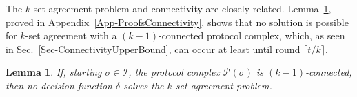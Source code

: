 \documentclass[11pt]{article}
\newcommand{\cI}{\ensuremath{\mathcal{I}}}
\newcommand{\cO}{\ensuremath{\mathcal{O}}}
\newcommand{\cP}{\ensuremath{\mathcal{P}}}
\newcommand{\bbG}{\ensuremath{\mathbb{G}}}
\newcommand{\bbP}{\ensuremath{\mathbb{P}}}
\DeclareMathOperator{\views}{views}
\newtheorem{definition}[theorem]{Definition}
\newtheorem{lemma}[theorem]{Lemma}
\newcommand{\set}[1]{\{#1\}}
\begin{document}
\begin{comment}
The $k$-set agreement problem~\cite{ksetagreement},
is a fundamental task having important associations
with protocol complex connectivity.
In Byzantine systems,
it can be difficult to characterize the input of a faulty process,
since this process can ignore its ``prescribed'' input and behave as having a different one.
This intrinsically leads to many alternative formulations for the problem in Byzantine systems \cite{dePriscoMR2001}.

Here,
we adopt a formulation that is intended both to make sense in practice,
and to have implications on our connectivity arguments discussed before.
Each non-faulty process $P_i$ starts with \emph{any} value $I_i$ from $V = \set{v_0, \ldots, v_d}$,
with $d \ge k$ and $t \ge k \ge 1$,
and finishes with a value $O_i$ from $V$, respecting:
\textbf{(1)~Agreement.}
At most $k$ values are decided: $|\set{O_i: P_i \in \bbG}| \le k$.
\textbf{(2)~Strong Validity.}
For any non-faulty process $P_i$, the output $O_i$ is the input value of a non-faulty process.
\textbf{(3)~Termination.}
The protocol finishes in a finite number of rounds.

\begin{definition}
\label{definition-task}
A Byzantine, synchronous $k$-set agreement task is a triple $(\cI, \cO, \Delta)$ where
\begin{enumerate}[noitemsep]
	\item
$\cI$ is a pseudosphere $\Psi(\bbP, V)$, with $V = \set{v_0, \ldots, v_d}$, representing the input of the non-faulty processes.
We have $\dim(\cI) = n$ since, for any input assignment, we have an admissible execution where all processes are benign.
	\item
$\cO$ is $\cup_{V' \subseteq V} \Psi(\bbP, V')$ where $|V'| \le k$, representing the output of the non-faulty processes.
We have $\dim(\cO) = n$ since, for any output assignment, we have an admissible execution where all processes have been benign.
	\item
$\Delta: \cI \to \cO$ where if $\tau \in \Delta(\sigma)$,
then $\dim(\sigma) \ge n - t$, $\views(\tau) \subseteq \views(\sigma)$, and $|\views(\tau)| \le k$.
\end{enumerate}
\end{definition}
\end{comment}

The $k$-set agreement problem and connectivity are closely related.
Lemma~\ref{lemma-connectivitykset},
proved in Appendix~\ref{App-ProofsConnectivity},
shows that
no solution is possible for $k$-set agreement
with a $(k - 1)$-connected protocol complex,
which,
as seen in Sec.~\ref{Sec-ConnectivityUpperBound},
can occur at least until round $\lceil t/k \rceil$.
\begin{lemma}
\label{lemma-connectivitykset}
If, starting $\sigma \in \cI$,
the protocol complex $\cP(\sigma)$ is $(k - 1)$-connected,
then no decision function $\delta$ solves the $k$-set agreement problem.
\end{lemma}
\end{document}
